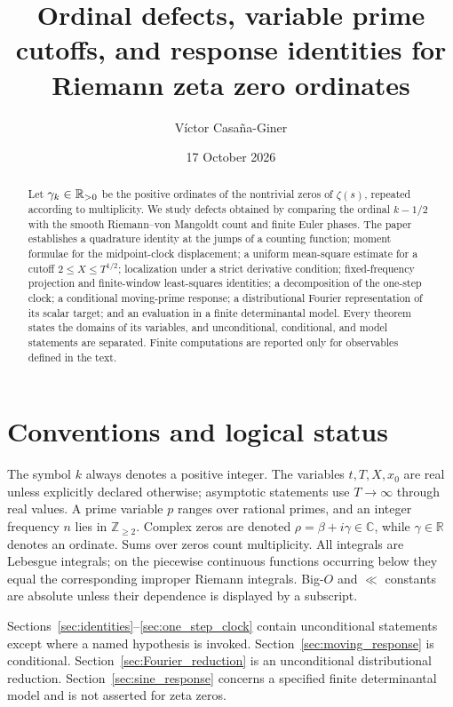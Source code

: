 \documentclass[11pt,reqno]{amsart}
\title[Ordinal defects and prime cutoffs]{Ordinal defects, variable prime cutoffs, and response identities for Riemann zeta zero ordinates}
\author{V\'ictor Casa\~na-Giner}\address{Valencia, Spain}\email{Email to be inserted}\subjclass[2020]{11M26, 11M06, 11Y35}\keywords{Riemann zeta-function, zero ordinates, Selberg approximation, Euler phases, pair correlation}\date{17 October 2026}
\theoremstyle{plain}\newtheorem{theorem}{Theorem}[section]\newtheorem{proposition}[theorem]{Proposition}\newtheorem{lemma}[theorem]{Lemma}\newtheorem{corollary}[theorem]{Corollary}
\theoremstyle{definition}\newtheorem{hypothesis}[theorem]{Hypothesis}\newtheorem{definition}[theorem]{Definition}
\theoremstyle{remark}\newtheorem{remark}[theorem]{Remark}\newtheorem{experiment}[theorem]{Experiment}\newtheorem{question}[theorem]{Question}\newtheorem{heuristic}[theorem]{Heuristic}\newtheorem{conjecture}[theorem]{Conjecture}
\begin{document}
\begin{abstract}
Let $\gamma_k\in\mathbb R_{>0}$ be the positive ordinates of the nontrivial zeros of $\zeta(s)$, repeated according to multiplicity.  We study defects obtained by comparing the ordinal $k-1/2$ with the smooth Riemann--von Mangoldt count and finite Euler phases.  The paper establishes a quadrature identity at the jumps of a counting function; moment formulae for the midpoint-clock displacement; a uniform mean-square estimate for a cutoff $2\le X\le T^{1/2}$; localization under a strict derivative condition; fixed-frequency projection and finite-window least-squares identities; a decomposition of the one-step clock; a conditional moving-prime response; a distributional Fourier representation of its scalar target; and an evaluation in a finite determinantal model.  Every theorem states the domains of its variables, and unconditional, conditional, and model statements are separated.  Finite computations are reported only for observables defined in the text.
\end{abstract}\maketitle

\section{Conventions and logical status}\label{sec:conventions}
The symbol $k$ always denotes a positive integer.  The variables $t,T,X,x_0$ are real unless explicitly declared otherwise; asymptotic statements use $T\to\infty$ through real values.  A prime variable $p$ ranges over rational primes, and an integer frequency $n$ lies in $\mathbb Z_{\ge2}$.  Complex zeros are denoted $\rho=\beta+i\gamma\in\mathbb C$, while $\gamma\in\mathbb R$ denotes an ordinate.  Sums over zeros count multiplicity.  All integrals are Lebesgue integrals; on the piecewise continuous functions occurring below they equal the corresponding improper Riemann integrals.  Big-$O$ and $\ll$ constants are absolute unless their dependence is displayed by a subscript.

Sections~\ref{sec:identities}--\ref{sec:one_step_clock} contain unconditional statements except where a named hypothesis is invoked.  Section~\ref{sec:moving_response} is conditional.  Section~\ref{sec:Fourier_reduction} is an unconditional distributional reduction.  Section~\ref{sec:sine_response} concerns a specified finite determinantal model and is not asserted for zeta zeros.
\end{document}
